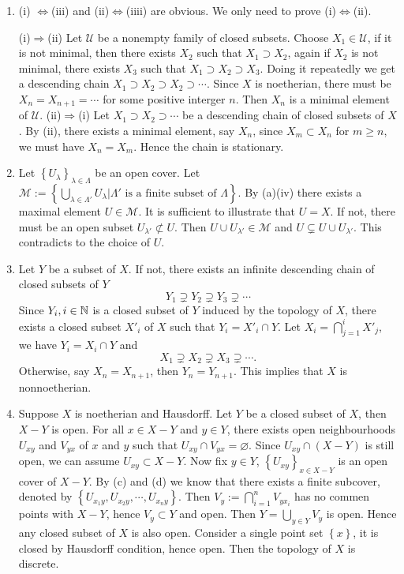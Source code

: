 \begin{solution}
  \begin{enumerate}
    \item (i) $\Leftrightarrow$(iii) and (ii)$\Leftrightarrow$(iiii) are obvious. We only need to prove (i)$\Leftrightarrow$(ii).

    (i)$\Rightarrow$(ii) Let $\mathcal{U}$ be a nonempty family of closed subsets. Choose $X_1 \in \mathcal{U}$, if it is not minimal, then there exists $X_2$ such that $X_1\supset X_2$, again if $X_2$ is not minimal, there exists $X_3$ such that $X_1\supset X_2\supset X_3$. Doing it repeatedly we get a descending chain $X_1\supset X_2\supset X_2\supset \cdots$. Since $X$ is noetherian, there must be $X_n=X_{n+1}=\cdots$ for some positive interger $n$. Then $X_n$ is a minimal element of $\mathcal{U}$.
      (ii)$\Rightarrow$(i) Let $X_1\supset X_2\supset \cdots$ be a descending chain of closed subsets of $X$. By (ii), there exists a minimal element, say $X_n$, since  $X_m\subset X_n$ for $m\ge n$, we must have  $X_n=X_m$. Hence the chain is stationary.
    \item Let $\left\{U_\lambda\right\} _{\lambda\in \Lambda}$ be an open cover. Let $\mathcal{M}:= \left\{\bigcup_{\lambda \in \Lambda'} U_\lambda\lvert \Lambda' \text{ is a finite subset of }\Lambda  \right\} $. By (a)(iv) there exists a maximal element $U\in \mathcal{M}$. It is sufficient to illustrate that $U=X$. If not, there must be an open subset $U_{\lambda'}\not\subset U$. Then $U \cup U_{\lambda'}\in \mathcal{M}$ and $U\subsetneq U \cup U_{\lambda'}$. This contradicts to the choice of $U$.
    \item Let $Y$ be a subset of $X$. If not, there exists an infinite descending chain of closed subsets of $Y$
      \[
	Y_1\supsetneq Y_2\supsetneq Y_3\supsetneq \cdots
      \] 
      Since  $Y_i,i\in \mathbb{N}$ is a closed subset of $Y$ induced by the topology of $X$, there exists a closed subset  $X'_i$ of $X$ such that  $Y_i=X'_i\cap Y$. Let $X_i=\bigcap_{j=1} ^{i}X'_j$, we have $Y_i=X_i\cap Y$ and
     \[
     X_1\supsetneq X_2\supsetneq X_3\supsetneq \cdots.
     \] 
     Otherwise, say $X_n=X_{n+1}$, then $Y_n=Y_{n+1}$. This implies that $X$ is nonnoetherian.
   \item Suppose $X$ is noetherian and Hausdorff. Let $Y$ be a closed subset of $X$, then $X-Y$ is open. For all $x\in X-Y$ and $y\in Y$, there exists open neighbourhoods $U_{xy}$ and $V_{yx}$ of $x$ and $y$ such that $U_{xy}\cap V_{yx}=\varnothing$. Since $U_{xy}\cap (X-Y)$ is still open, we can assume $U_{xy}\subset X-Y$. Now fix $y\in Y$, $\left\{U_{xy}\right\} _{x\in X-Y}$ is an open cover of $X-Y$. By (c) and (d) we know that there exists a finite subcover, denoted by $\left\{U_{x_1 y},U_{x_2 y},\cdots,U_{x_n y}\right\} $. Then $V_y:= \bigcap_{i=1} ^{n}V_{yx_i}$ has no commen points with $X-Y$, hence  $V_y\subset Y$ and open. Then $Y=\bigcup_{y\in Y} V_y$ is open. Hence any closed subset of $X$ is also open. Consider a single point set $\left\{x\right\} $, it is closed by Hausdorff condition, hence open. Then the topology of $X$ is discrete.


\end{enumerate}
\end{solution}
